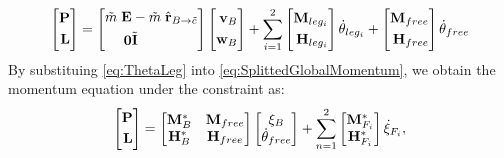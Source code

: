 \begin{equation}
\left[
\begin{aligned}
\textbf{P}\\
\textbf{L}\\
\end{aligned}
\right] = 
\left[
\begin{aligned}
\tilde{m}\; {\bf E} & -\tilde{m}\; \hat{\bf r}_{B \rightarrow \tilde{c}}  \\
{\bf 0}           &  \tilde{\bf I}                                 \\
\end{aligned}
\right]
\left[
\begin{aligned}
\textit{\bf v}_B \\
\textit{\bf w}_B \\
\end{aligned}
\right]
+
\sum^{2}_{i=1}
\left[
\begin{aligned}
{\bf M} _{leg_i}\\
{\bf H} _{leg_i}\\
\end{aligned}
\right]
\dot{\bf \theta}_{leg_i} 
+
\left[
\begin{aligned}
{\bf M} _{free}\\
{\bf H} _{free}\\
\end{aligned}
\right]
\dot{\bf \theta}_{free} 
\label{eq:SplittedGlobalMomentum}
\end{equation}
By substituing \ref{eq:ThetaLeg} into \ref{eq:SplittedGlobalMomentum},
we obtain the momentum equation under the constraint as:
\begin{equation}
\left[
\begin{aligned}
\textbf{P}\\
\textbf{L}\\
\end{aligned}
\right] = 
\left[
\begin{matrix}
{\bf M}^*_{B} & {\bf M}_{free}\\
{\bf H}^*_{B} & {\bf H}_{free}\\
\end{matrix}
\right]
\left[
\begin{matrix}
{\bf \xi}_{B}\\
\dot{\theta}_{free}\\
\end{matrix}
\right]
+
\sum_{n=1}^{2}
\left[
\begin{matrix}
{\bf M}^*_{F_i}\\
{\bf H}^*_{F_i}\\
\end{matrix}
\right]
\dot{{\bf \xi}}_{F_i},
\label{eq:ConstraintedMomentum}
\end{equation}
